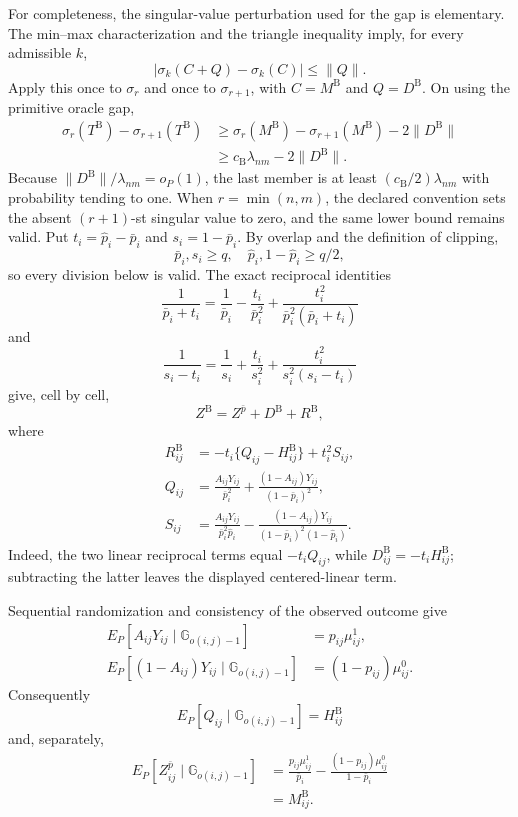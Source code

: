 For completeness, the singular-value perturbation used for the gap is elementary.  The min--max characterization and the triangle inequality imply, for every admissible \(k\),
\[
 |\sigma_k(C+Q)-\sigma_k(C)|\le\lVert Q\rVert.
\]
Apply this once to \(\sigma_r\) and once to \(\sigma_{r+1}\), with \(C=M^{\mathrm B}\) and \(Q=D^{\mathrm B}\).  On using the primitive oracle gap,
\[
 \begin{aligned}
 \sigma_r(T^{\mathrm B})-\sigma_{r+1}(T^{\mathrm B})
 &\ge \sigma_r(M^{\mathrm B})-\sigma_{r+1}(M^{\mathrm B})
      -2\lVert D^{\mathrm B}\rVert\\
 &\ge c_{\mathrm B}\lambda_{nm}-2\lVert D^{\mathrm B}\rVert.
 \end{aligned}
\]
Because \(\lVert D^{\mathrm B}\rVert/\lambda_{nm}=o_P(1)\), the last member is at least \((c_{\mathrm B}/2)\lambda_{nm}\) with probability tending to one.  When \(r=\min(n,m)\), the declared convention sets the absent \((r+1)\)-st singular value to zero, and the same lower bound remains valid.
Put \(t_i=\widehat p_i-\bar p_i\) and \(s_i=1-\bar p_i\).  By overlap and the definition of clipping,
\[
 \bar p_i,s_i\ge q,
 \quad
 \widehat p_i,1-\widehat p_i\ge q/2,
\]
so every division below is valid.  The exact reciprocal identities
\[
 \frac1{\bar p_i+t_i}
 =\frac1{\bar p_i}-\frac{t_i}{\bar p_i^2}
 +\frac{t_i^2}{\bar p_i^2(\bar p_i+t_i)}
\]
and
\[
 \frac1{s_i-t_i}
 =\frac1{s_i}+\frac{t_i}{s_i^2}
 +\frac{t_i^2}{s_i^2(s_i-t_i)}
\]
give, cell by cell,
\[
 Z^{\mathrm B}=Z^{\bar p}+D^{\mathrm B}+R^{\mathrm B},
\]
where
\[
 \begin{aligned}
 R^{\mathrm B}_{ij}
 &=-t_i\{Q_{ij}-H^{\mathrm B}_{ij}\}+t_i^2S_{ij},\\
 Q_{ij}
 &=\frac{A_{ij}Y_{ij}}{\bar p_i^2}
   +\frac{(1-A_{ij})Y_{ij}}{(1-\bar p_i)^2},\\
 S_{ij}
 &=\frac{A_{ij}Y_{ij}}{\bar p_i^2\widehat p_i}
   -\frac{(1-A_{ij})Y_{ij}}
   {(1-\bar p_i)^2(1-\widehat p_i)}.
 \end{aligned}
\]
Indeed, the two linear reciprocal terms equal \(-t_iQ_{ij}\), while \(D^{\mathrm B}_{ij}=-t_iH^{\mathrm B}_{ij}\); subtracting the latter leaves the displayed centered-linear term.

Sequential randomization and consistency of the observed outcome give
\[
 \begin{aligned}
 E_P[A_{ij}Y_{ij}\mid\mathbb G_{o(i,j)-1}]
 &=p_{ij}\mu^1_{ij},\\
 E_P[(1-A_{ij})Y_{ij}\mid\mathbb G_{o(i,j)-1}]
 &=(1-p_{ij})\mu^0_{ij}.
 \end{aligned}
\]
Consequently
\[
 E_P[Q_{ij}\mid\mathbb G_{o(i,j)-1}]=H^{\mathrm B}_{ij}
\]
and, separately,
\[
 \begin{aligned}
 E_P[Z^{\bar p}_{ij}\mid\mathbb G_{o(i,j)-1}]
 &=\frac{p_{ij}\mu^1_{ij}}{\bar p_i}
   -\frac{(1-p_{ij})\mu^0_{ij}}{1-\bar p_i}\\
 &=M^{\mathrm B}_{ij}.
 \end{aligned}
\]

